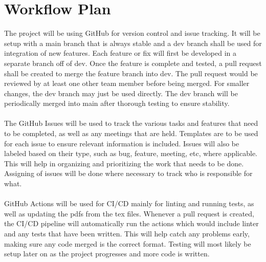 \documentclass{article}
\begin{document}

\section{Workflow Plan}

	
  
  The project will be using GitHub for version control and issue tracking. It will be setup with a main branch that is always stable and
  a dev branch shall be used for integration of new features. Each feature or fix will first be developed in a separate branch off of dev. 
  Once the feature is complete and tested, a pull request shall be created to merge the feature branch into dev. The pull request would be 
  reviewed by at least one other team member before being merged. For smaller changes, the dev branch may just be used directly. The dev 
  branch will be periodically merged into main after thorough testing to ensure stability. 
  \\
  \\
  The GitHub Issues will be used to track the various tasks and features that need to be completed, as well as any meetings that are held.
  Templates are to be used for each issue to ensure relevant information is included. Issues will also be labeled based on their type, 
  such as bug, feature, meeting, etc, where applicable. This will help in organizing and prioritizing the work that needs to be done. 
  Assigning of issues will be done where necessary to track who is responsible for what.
  \\
  \\
  GitHub Actions will be used for CI/CD mainly for linting and running tests, as well as updating the pdfs from the tex files. Whenever a 
  pull request is created, the CI/CD pipeline will automatically run the actions which would include linter and any tests that have been 
  written. This will help catch any problems early, making sure any code merged is the correct format. Testing will most likely be setup
  later on as the project progresses and more code is written.
\end{document}
